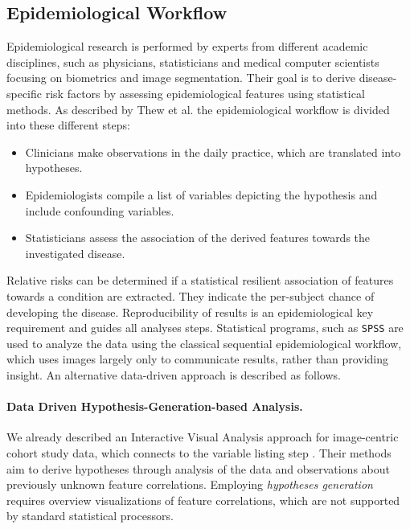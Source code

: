 \documentclass[journal]{style/vgtc} 			          %
\begin{document}
\subsection{Epidemiological Workflow} \label{EpidemiologicalWorkflow}
Epidemiological research is performed by experts from different academic disciplines, such as physicians, statisticians and medical computer scientists focusing on biometrics and image segmentation.
Their goal is to derive disease-specific risk factors by assessing epidemiological features using statistical methods.
As described by Thew et al. \cite{Thew2009} the epidemiological workflow is divided into these different steps:
\begin{itemize}
	\item Clinicians make observations in the daily practice, which are translated into hypotheses.
	\item Epidemiologists compile a list of variables depicting the hypothesis and include confounding variables.
	\item Statisticians assess the association of the derived features towards the investigated disease.
\end{itemize}
Relative risks can be determined if a statistical resilient association of features towards a condition are extracted.
They indicate the per-subject chance of developing the disease.
Reproducibility of results is an epidemiological key requirement and guides all analyses steps.
Statistical programs, such as \texttt{SPSS} are used to analyze the data using the classical sequential epidemiological workflow, which uses images largely only to communicate results, rather than providing insight.
An alternative data-driven approach is described as follows.

\paragraph{Data Driven Hypothesis-Generation-based Analysis.}
We already described an Interactive Visual Analysis approach for image-centric cohort study data, which connects to the variable listing step \cite{Klemm2014VIS}.
Their methods aim to derive hypotheses through analysis of the data and observations about previously unknown feature correlations.
Employing \emph{hypotheses generation} requires overview visualizations of feature correlations, which are not supported by standard statistical processors.
\end{document}
